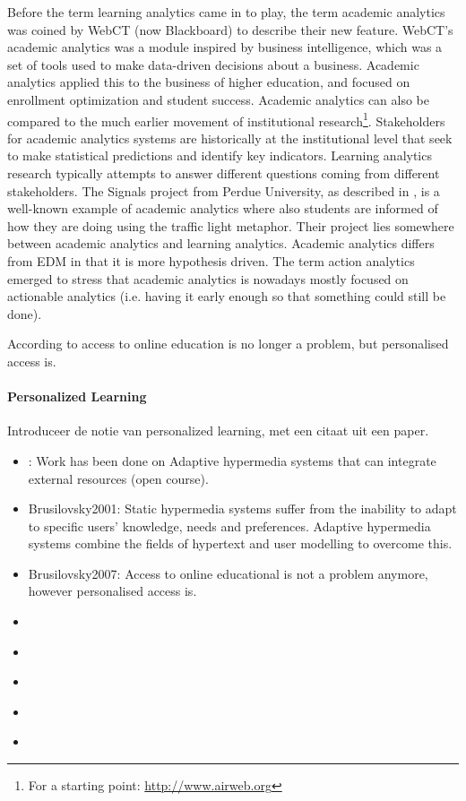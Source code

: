 \documentclass[11pt]{article}
\begin{document}
Before the term learning analytics came in to play, the term academic analytics was coined by WebCT (now Blackboard) to describe their new feature. WebCT's academic analytics was a module inspired by business intelligence, which was a set of tools used to make data-driven decisions about a business. Academic analytics applied this to the business of higher education, and focused on enrollment optimization and student success. Academic analytics can also be compared to the much earlier movement of institutional research\footnote{For a starting point: \url{http://www.airweb.org}}. Stakeholders for academic analytics systems are historically at the institutional level that seek to make statistical predictions and identify key indicators. Learning analytics research typically attempts to answer different questions coming from different stakeholders. The Signals project from Perdue University, as described in \cite{Arnold2010}, is a well-known example of academic analytics where also students are informed of how 
they are doing using the traffic light metaphor. Their project lies somewhere between academic analytics and learning analytics. Academic analytics differs from EDM in that it is more hypothesis driven. The term action analytics emerged to stress that academic analytics is nowadays mostly focused on actionable analytics (i.e. having it early enough so that something could still be done).

According to \cite{Brusilovsky2007} access to online education is no longer a problem, but personalised access is. 

\paragraph{Personalized Learning}
Introduceer de notie van personalized learning, met een citaat uit een paper.
\begin{itemize}
  \item \cite{Weber2001}: Work has been done on Adaptive hypermedia systems that can integrate external resources (open course).
  \item Brusilovsky2001: Static hypermedia systems suffer from the inability to adapt to specific users' knowledge, needs and preferences. Adaptive hypermedia systems combine the fields of hypertext and user modelling to overcome this.
  \item Brusilovsky2007: Access to online educational is not a problem anymore, however personalised access is.
  \item \cite{Brusilovsky2003}
  \item \cite{Henze2001}
  \item \cite{Farzan2004}
  \item \cite{Tand2005}
  \item \cite{Modritscher2011}
\end{itemize}
\end{document}
